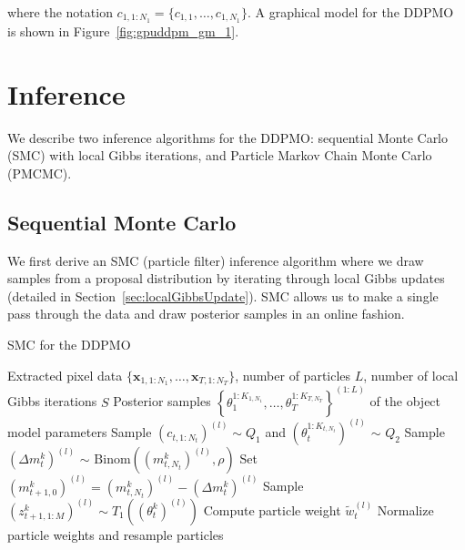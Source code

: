 \documentclass{article}
\begin{document}
where the notation $c_{1,1:N_1} = \{ c_{1,1}, \ldots, c_{1,N_1} \}$. A graphical model for the DDPMO is shown in Figure~\ref{fig:gpuddpm_gm_1}.

\section{Inference}
We describe two inference algorithms for the DDPMO: sequential Monte Carlo (SMC) with local Gibbs iterations, and Particle Markov Chain Monte Carlo (PMCMC).

\subsection{Sequential Monte Carlo}
We first derive an SMC (particle filter) inference algorithm where we draw samples from a proposal distribution by iterating through local Gibbs updates (detailed in Section~\ref{sec:localGibbsUpdate}). SMC allows us to make a single pass through the data and draw posterior samples in an online fashion.
\begin{algorithm}[H]
    \caption{SMC for the DDPMO}
    \label{alg:SMC}
    \begin{algorithmic}[1]
        \REQUIRE Extracted pixel data $\{ \mathbf{x}_{1,1:N_1},\ldots,\mathbf{x}_{T,1:N_T} \}$, 
            number of particles $L$, 
            number of local Gibbs iterations $S$
        \ENSURE Posterior samples $\left\{\theta_1^{1:K_{1,N_1}},\ldots,\theta_T^{1:K_{T,N_T}}\right\}^{(1:L)}$ 
            of the object model parameters
                    \STATE Sample $(c_{t,1:N_t})^{(l)} \sim Q_1$ and 
                    $(\theta_t^{1:K_{t,N_t}})^{(l)}$ $\sim$ $Q_2$ 
                \ENDFOR
                    \STATE Sample $(\Delta m_t^k)^{(l)}$ $\sim$ $\text{Binom}((m_{t,N_t}^k)^{(l)},\rho)$
                    \STATE Set $(m_{t+1,0}^k)^{(l)} = (m_{t,N_t}^k)^{(l)} - (\Delta m_t^k)^{(l)}$
                    \STATE Sample $(z_{t+1,1:M}^k)^{(l)} \sim T_1((\theta_t^k)^{(l)})$ 
                \ENDFOR
                \STATE Compute particle weight $\tilde{w}_{t}^{(l)}$
            \ENDFOR
            \STATE Normalize particle weights and resample particles
        \ENDFOR
    \end{algorithmic}
\end{algorithm}
\end{document}
